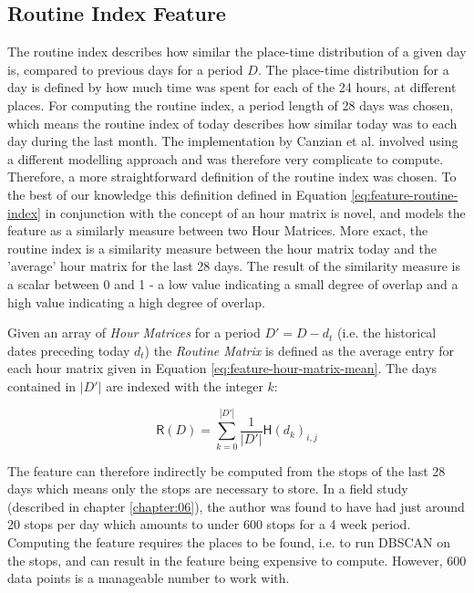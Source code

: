 \subsection{Routine Index Feature}
\label{sub:routine-index}
The routine index describes how similar the place-time distribution of a given day is, compared to previous days for a period $D$. The place-time distribution for a day is defined by how much time was spent for each of the 24 hours, at different places. For computing the routine index, a period length of 28 days was chosen, which means the routine index of today describes how similar today was to each day during the last month. The implementation by Canzian et al. \cite{Canzian2015} involved using a different modelling approach and was therefore very complicate to compute.  Therefore, a more straightforward definition of the routine index was chosen. To the best of our knowledge this definition defined in Equation \eqref{eq:feature-routine-index} in conjunction with the concept of an hour matrix is novel, and models the feature as a similarly measure between two Hour Matrices. More exact, the routine index is a similarity measure between the hour matrix today and the 'average' hour matrix for the last 28 days. The result of the similarity measure is a scalar between 0 and 1 - a low value indicating a small degree of overlap and a high value indicating a high degree of overlap. 

Given an array of \textit{Hour Matrices} for a period $D' = D - d_t$ (i.e. the historical dates preceding today $d_t$) the \textit{Routine Matrix} is defined as the average entry for each hour matrix given in Equation \eqref{eq:feature-hour-matrix-mean}. The days contained in $|D'|$ are indexed with the integer $k$:

\begin{equation}
\label{eq:feature-hour-matrix-mean}
\mathsf{R}(D) = \sum_{k=0}^{|D'|} \frac{1}{|D'|} \mathsf{H}(d_{k})_{i,j}
\end{equation}

The feature can therefore indirectly be computed from the stops of the last 28 days which means only the stops are necessary to store. In a field study (described in chapter \ref{chapter:06}), the author was found to have had just around 20 stops per day which amounts to under 600 stops for a 4 week period. Computing the feature requires the places to be found, i.e. to run DBSCAN on the stops, and can result in the feature being expensive to compute. However, 600 data points is a manageable number to work with.

